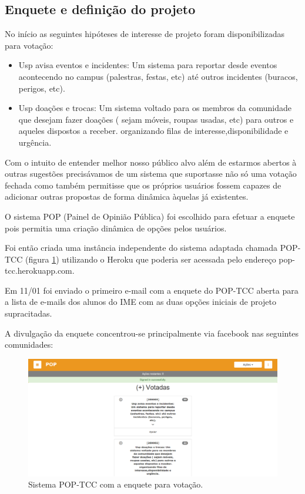 \subsection{Enquete e definição do projeto}
        \par  No início as seguintes hipóteses de interesse de projeto foram disponibilizadas para votação:
                \begin{itemize}
                \item {Usp avisa eventos e incidentes:} Um sistema para reportar desde eventos acontecendo no campus (palestras, festas, etc) até outros incidentes (buracos, perigos, etc).
                \item {Usp doações e trocas: } Um sistema voltado para os membros da comunidade que desejam fazer doações ( sejam móveis, roupas usadas, etc) para outros e aqueles dispostos a receber. organizando filas de interesse,disponibilidade e urgência.
                \end{itemize}
        \par Com o intuito de entender melhor nosso público alvo além de estarmos abertos à outras sugestões precisávamos de um sistema que suportasse não só uma votação fechada como também permitisse que os próprios usuários fossem capazes de adicionar outras propostas de forma dinâmica àquelas já existentes.
        \par O sistema POP (Painel de Opinião Pública) foi escolhido para efetuar a enquete pois permitia uma criação dinâmica de opções pelos usuários.
        \par Foi então criada uma instância independente do sistema adaptada chamada POP-TCC (figura \ref{fig:pop-tcc}) utilizando o Heroku que poderia ser acessada pelo endereço pop-tcc.herokuapp.com.
        \par Em 11/01 foi enviado o primeiro e-mail com a enquete do POP-TCC aberta para a lista de e-mails dos alunos do IME com as duas opções iniciais de projeto supracitadas. \par A divulgação da enquete concentrou-se principalmente via facebook nas seguintes comunidades:
\begin{figure}[htb]
\includegraphics[width=15cm]{figuras/pop-tcc}
\caption{\label{fig:pop-tcc} Sistema POP-TCC com a enquete para votação.}
\end{figure}
